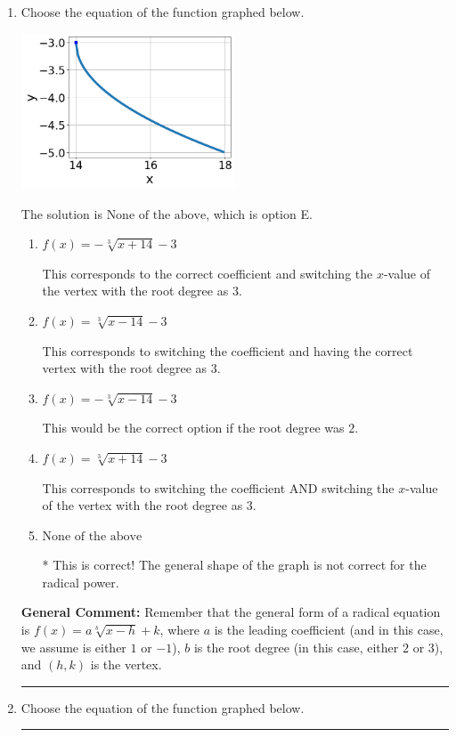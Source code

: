 \documentclass{extbook}[14pt]
\newcommand{\litem}[1]{\item #1

\rule{\textwidth}{0.4pt}}
\begin{document}
\begin{enumerate}\litem{
Choose the equation of the function graphed below.

\begin{center}
    \includegraphics[width=0.5\textwidth]{../Figures/radicalGraphToEquationC.png}
\end{center}


The solution is \( \text{None of the above} \), which is option E.\begin{enumerate}[label=\Alph*.]
\item \( f(x) = - \sqrt[3]{x + 14} - 3 \)

This corresponds to the correct coefficient and switching the $x$-value of the vertex with the root degree as $3$.
\item \( f(x) = \sqrt[3]{x - 14} - 3 \)

This corresponds to switching the coefficient and having the correct vertex with the root degree as $3$.
\item \( f(x) = - \sqrt[3]{x - 14} - 3 \)

This would be the correct option if the root degree was $2$.
\item \( f(x) = \sqrt[3]{x + 14} - 3 \)

This corresponds to switching the coefficient AND switching the $x$-value of the vertex with the root degree as $3$.
\item \( \text{None of the above} \)

* This is correct! The general shape of the graph is not correct for the radical power.
\end{enumerate}

\textbf{General Comment:} Remember that the general form of a radical equation is $ f(x) = a \sqrt[b]{x - h} + k$, where $a$ is the leading coefficient (and in this case, we assume is either $1$ or $-1$), $b$ is the root degree (in this case, either $2$ or $3$), and $(h, k)$ is the vertex.
}
\litem{
Choose the equation of the function graphed below.

}
\end{enumerate}
\end{document}
